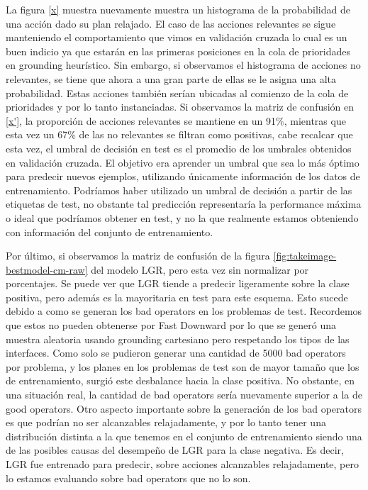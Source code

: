 La figura \ref{x} muestra nuevamente muestra un histograma
de la probabilidad de una acción dado su plan relajado. El caso de las acciones
relevantes se sigue manteniendo el comportamiento que vimos en validación cruzada
lo cual es un buen indicio ya que estarán en las primeras posiciones en la cola de prioridades en grounding heurístico. Sin embargo, si observamos el histograma de acciones no relevantes, se tiene que ahora a una gran parte de ellas se le asigna una alta probabilidad. Estas acciones también serían ubicadas al comienzo de la cola de prioridades y por lo tanto instanciadas. Si observamos la matriz
de confusión en \ref{x'}, la proporción de acciones relevantes se mantiene en un 91\%, mientras que esta vez un 67\% de las no relevantes se filtran como positivas, cabe recalcar que esta vez, el umbral de decisión en test es el promedio de los umbrales obtenidos en validación cruzada. El objetivo era aprender un umbral que sea lo más óptimo para predecir nuevos ejemplos, utilizando únicamente información de los datos de entrenamiento. Podríamos haber utilizado un umbral de decisión a partir de las etiquetas de test, no obstante tal predicción representaría la performance máxima o ideal que podríamos obtener en test, y no la que realmente estamos obteniendo con información del conjunto de entrenamiento.

Por último, si observamos la matriz de confusión de la figura \ref{fig:takeimage-bestmodel-cm-raw} del modelo LGR, pero esta vez sin
normalizar por porcentajes. Se puede ver que LGR tiende a predecir ligeramente sobre
la clase positiva, pero además es la mayoritaria en test para este esquema.
Esto sucede debido a como se generan los bad operators en los problemas de test.
Recordemos que estos no pueden obtenerse por Fast Downward por lo que se generó una muestra aleatoria usando grounding cartesiano pero respetando los tipos de las interfaces. Como solo se pudieron generar una cantidad de 5000 bad operators por problema, y los planes en los problemas de test son de mayor tamaño que los de entrenamiento, surgió este desbalance hacia la clase positiva. No obstante, en una situación real, la cantidad de bad operators sería nuevamente superior a la de good operators. Otro aspecto importante sobre la generación de los bad operators es que podrían no ser alcanzables relajadamente, y por lo tanto tener una distribución distinta a la que tenemos en el conjunto de entrenamiento siendo una de las posibles causas del desempeño de LGR para la clase negativa. Es decir, LGR fue entrenado para predecir, sobre acciones alcanzables relajadamente, pero lo estamos evaluando sobre bad operators que no lo son.

